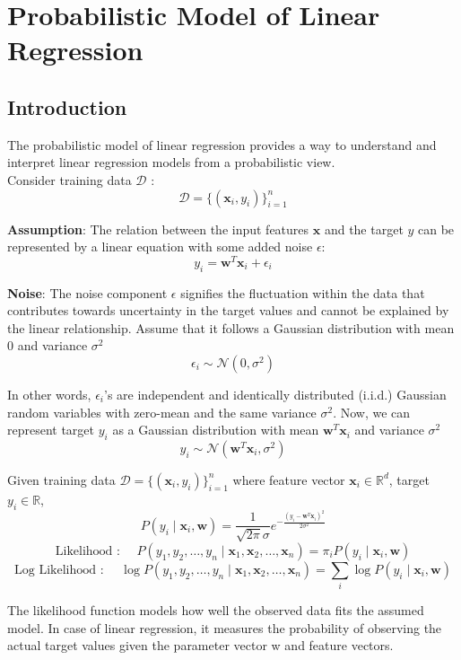 \documentclass{report}
\newcommand{\w}{\mathbf{w}} %
\newcommand{\x}{\mathbf{x}}
\newcommand{\D}{\mathcal{D}}
\begin{document}

\chapter{Probabilistic Model of Linear Regression}
\section{Introduction}

The probabilistic model of linear regression provides a way to understand and interpret linear regression models from a probabilistic view. \\

Consider training data $\D$ :
$$
  \D = \{(\x_i,y_i)\}_{i=1}^n
$$

\textbf{Assumption}: The relation between the input features $\x$ and the target $y$ can be represented by a linear equation with some added noise $\epsilon$:
$$
  y_i = \w^T\x_i + \epsilon_i
$$

\textbf{Noise}: The noise component $\epsilon$ signifies the fluctuation within the data that contributes towards uncertainty in the target values and cannot be explained by the linear relationship. Assume that it follows a Gaussian distribution with mean 0 and variance $\sigma^2$
$$
  \epsilon_i \sim \mathcal{N}(0, \sigma^2)
$$

In other words, $\epsilon_i$'s are independent and identically distributed (i.i.d.) Gaussian random variables with zero-mean and the same variance $\sigma^2$. Now, we can represent target $y_i$ as a Gaussian distribution with mean $\w^T\x_i$ and variance $\sigma^2$
$$
  y_i \sim \mathcal{N}(\w^T\x_i, \sigma^2)
$$

Given training data $\D = \{(\x_i, y_i)\}_{i=1}^{n}$ where feature vector $\x_i \in \mathbb{R}^{d}$, target $y_i \in \mathbb{R}$,
$$
  P(y_i \mid \x_i, \w)=\frac{1}{\sqrt{2\pi}\sigma} e^{-\frac{(y_i - \w^T\x_i)^2}{2\sigma^2}}
$$
$$
  \text{Likelihood : } \quad P(y_1, y_2, \ldots, y_n \mid \x_1, \x_2, \ldots, \x_n) = \pi_i P(y_i \mid \x_i, \w)
$$
$$
  \text{Log Likelihood : } \quad \log P(y_1, y_2, \ldots, y_n \mid \x_1, \x_2, \ldots, \x_n) = \underset{i}{\sum} \log P(y_i \mid \x_i, \w)
$$

The likelihood function models how well the observed data fits the assumed model. In case of linear regression, it measures the probability of observing the actual target values given the parameter vector w and feature vectors.
\end{document}
